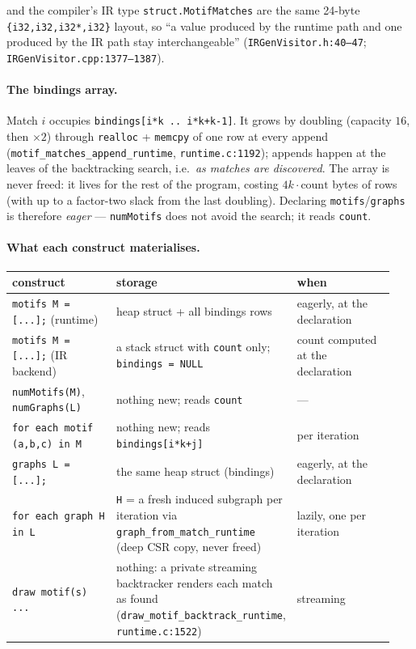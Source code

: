 \documentclass[11pt,a4paper]{article}
\newcommand{\code}[1]{\texttt{#1}}
\newcommand{\file}[1]{\texttt{#1}}
\begin{document}
and the compiler's IR type \code{struct.MotifMatches} are the same 24-byte
\code{\{i32,i32,i32*,i32\}} layout, so ``a value produced by the runtime path and
one produced by the IR path stay interchangeable''
(\file{IRGenVisitor.h:40--47}; \code{IRGenVisitor.cpp:1377--1387}).

\paragraph{The bindings array.} Match $i$ occupies
\code{bindings[i*k .. i*k+k-1]}. It grows by doubling (capacity $16$, then
$\times2$) through \code{realloc} + \code{memcpy} of one row at every append
(\code{motif\_matches\_append\_runtime}, \file{runtime.c:1192}); appends happen at
the leaves of the backtracking search, i.e.\ \emph{as matches are discovered}.
The array is never freed: it lives for the rest of the program, costing
$4k\cdot\text{count}$ bytes of rows (with up to a factor-two slack from the last
doubling). Declaring \code{motifs}/\code{graphs} is therefore \emph{eager} ---
\code{numMotifs} does not avoid the search; it reads \code{count}.

\paragraph{What each construct materialises.}

\begin{center}
\small
\begin{tabular}{@{}p{0.34\linewidth}p{0.24\linewidth}p{0.36\linewidth}@{}}
\toprule
construct & storage & when \\
\midrule
\code{motifs M = [...];} (runtime) & heap struct + all bindings rows & eagerly, at the declaration \\
\code{motifs M = [...];} (IR backend) & a stack struct with \code{count} only; \code{bindings = NULL} & count computed at the declaration \\
\code{numMotifs(M)}, \code{numGraphs(L)} & nothing new; reads \code{count} & --- \\
\code{for each motif (a,b,c) in M} & nothing new; reads \code{bindings[i*k+j]} & per iteration \\
\code{graphs L = [...];} & the same heap struct (bindings) & eagerly, at the declaration \\
\code{for each graph H in L} & \code{H} = a fresh induced subgraph per iteration via \code{graph\_from\_match\_runtime} (deep CSR copy, never freed) & lazily, one per iteration \\
\code{draw motif(s) ...} & nothing: a private streaming backtracker renders each match as found (\code{draw\_motif\_backtrack\_runtime}, \file{runtime.c:1522}) & streaming \\
\bottomrule
\end{tabular}
\end{center}
\end{document}
